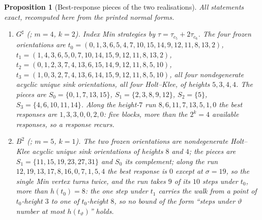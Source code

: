 \documentclass[11pt]{article}
\theoremstyle{plain}
\newtheorem{proposition}[theorem]{Proposition}
\theoremstyle{definition}
\begin{document}
\begin{proposition}[Best-response pieces of the two realisations]\label{prop:pieces-measured}
All statements exact, recomputed here from the printed normal forms.
\begin{enumerate}[label=(\alph*),leftmargin=2.2em]
\item $G^{\sharp}$ (; $m=4$, $k=2$). Index Min
      strategies by $\tau=\tau_{c_5}+2\tau_{c_6}$. The four frozen
      orientations are
      $t_{0}=(0,1,3,6,5,4,7,10,15,14,9,12,11,8,13,2)$,
      $t_{1}=(1,4,3,6,5,0,7,10,14,15,9,12,11,8,13,2)$,
      $t_{2}=(0,1,2,3,7,4,13,6,15,14,9,12,11,8,5,10)$,
      $t_{3}=(1,0,3,2,7,4,13,6,14,15,9,12,11,8,5,10)$,
      all four nondegenerate acyclic unique sink orientations, all four
      Holt--Klee, of heights $5,3,4,4$. The pieces are
      $S_{0}=\{0,1,7,13,15\}$, $S_{1}=\{2,3,8,9,12\}$,
      $S_{2}=\{5\}$, $S_{3}=\{4,6,10,11,14\}$. Along the
      height-$7$ run $8,6,11,7,13,5,1,0$ the best responses are
      $1,3,3,0,0,2,0$: five blocks, more than the $2^{k}=4$ available
      responses, so a response recurs.
\item $B^{2}$ (; $m=5$, $k=1$). The two frozen
      orientations are nondegenerate Holt--Klee acyclic unique sink
      orientations of heights $8$ and $4$; the pieces are
      $S_1=\{11,15,19,23,27,31\}$ and $S_0$ its complement; along the run
      $12,19,13,17,8,16,0,7,1,5,4$ the best response is $0$ except at
      $\sigma=19$, so the single Min vertex turns twice, and the run takes
      $9$ of its $10$ steps under $t_0$, more than $h(t_0)=8$: the one step
      under $t_1$ carries the walk from a point of $t_0$-height $3$ to one
      of $t_0$-height $8$, so no bound of the form ``steps under
      $\vartheta$ number at most $h(t_\vartheta)$'' holds.
\end{enumerate}
\end{proposition}
\end{document}

